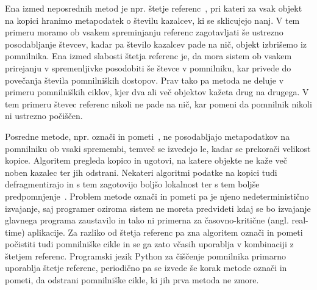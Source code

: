 Ena izmed neposrednih metod je npr. štetje referenc~\cite{collins1960method}, pri kateri za vsak objekt na kopici hranimo metapodatek o številu kazalcev, ki se sklicujejo nanj. V tem primeru moramo ob vsakem spreminjanju referenc zagotavljati še ustrezno posodabljanje števcev, kadar pa število kazalcev pade na nič, objekt izbrišemo iz pomnilnika. Ena izmed slabosti štetja referenc je, da mora sistem ob vsakem prirejanju v spremenljivke posodobiti še števce v pomnilniku, kar privede do povečanja števila pomnilniških dostopov. Prav tako pa metoda ne deluje v primeru pomnilniških ciklov, kjer dva ali več objektov kažeta drug na drugega. V tem primeru števec referenc nikoli ne pade na nič, kar pomeni da pomnilnik nikoli ni ustrezno počiščen.

Posredne metode, npr. označi in pometi~\cite{mccarthy1960recursive}, ne posodabljajo metapodatkov na pomnilniku ob vsaki spremembi, temveč se izvedejo le, kadar se prekorači velikost kopice. Algoritem pregleda kopico in ugotovi, na katere objekte ne kaže več noben kazalec ter jih odstrani. Nekateri algoritmi podatke na kopici tudi defragmentirajo in s tem zagotovijo boljšo lokalnost ter s tem boljše predpomnjenje~\cite{fenichel1969lisp}. Problem metode označi in pometi pa je njeno nedeterministično izvajanje, saj programer oziroma sistem ne moreta predvideti kdaj se bo izvajanje glavnega programa zaustavilo in tako ni primerna za časovno-kritične (angl. real-time) aplikacije. Za razliko od štetja referenc pa zna algoritem označi in pometi počistiti tudi pomnilniške cikle in se ga zato včasih uporablja v kombinaciji z štetjem referenc. Programski jezik Python za čiščenje pomnilnika primarno uporablja štetje referenc, periodično pa se izvede še korak metode označi in pometi, da odstrani pomnilniške cikle, ki jih prva metoda ne zmore.